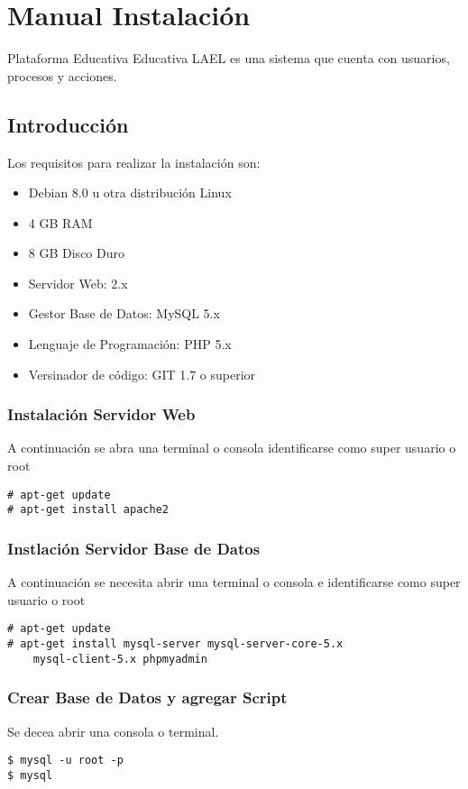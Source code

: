 \chapter{Manual Instalaci\'{o}n}

Plataforma Educativa Educativa LAEL es una sistema que cuenta con usuarios, 
procesos y acciones.

\section{Introducci\'{o}n}

Los requisitos para realizar la instalaci\'{o}n son:

\begin{itemize}

\item Debian 8.0 u otra distribuci\'{o}n Linux
\item 4 GB RAM
\item 8 GB Disco Duro
\item Servidor Web: 2.x
\item Gestor Base de Datos: MySQL 5.x
\item Lenguaje de Programaci\'{o}n: PHP 5.x
\item Versinador de c\'{o}digo: GIT 1.7 o superior

\end{itemize}

\subsection{Instalaci\'{o}n Servidor Web}

A continuaci\'{o}n se abra una terminal o consola
identificarse como super usuario o root

\begin{lstlisting}
# apt-get update
# apt-get install apache2
\end{lstlisting}

\subsection{Instlaci\'{o}n Servidor Base de Datos}

A continuaci\'{o}n se necesita abrir una terminal o consola
e identificarse como super usuario o root

\begin{lstlisting}
# apt-get update
# apt-get install mysql-server mysql-server-core-5.x 
	mysql-client-5.x phpmyadmin
\end{lstlisting}

\subsection{Crear Base de Datos y agregar Script}

Se decea abrir una consola o terminal.

\begin{lstlisting}
$ mysql -u root -p
$ mysql
\end{lstlisting}